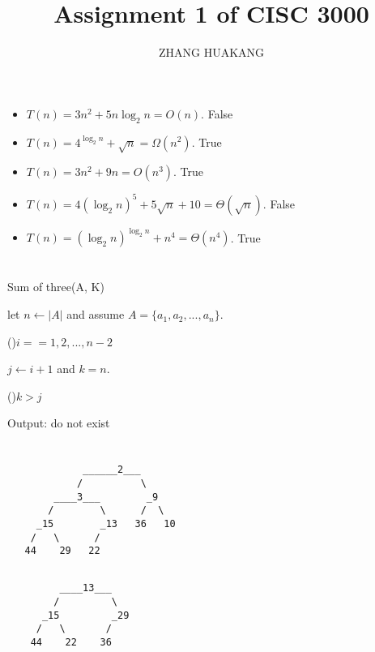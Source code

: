 \documentclass{article}
\title{Assignment 1 of CISC 3000}
\author{ZHANG HUAKANG}
\begin{document}
    \maketitle
    \section{}
    \begin{itemize}
        \item $T(n)=3n^2+5n\log_2n=O(n)$. False
        \item $T(n)=4^{\log_2n}+\sqrt{n}=\Omega(n^2)$. True
        \item $T(n)=3n^2+9n=O(n^3)$. True
        \item $T(n)=4(\log_2n)^5+5\sqrt{n}+10=\Theta(\sqrt{n})$. False
        \item $T(n)=(\log_2n)^{\log_2n}+n^4=\Theta(n^4)$. True
    \end{itemize}
    \section{}
    \begin{algorithm}[H]
        \caption{Sum of three(A, K)}
        let $n \leftarrow |A|$ and assume $A = \{a_1, a_2, . . . , a_n\}$.

        \For(){$i==1,2,...,n-2$}{
            $j\leftarrow i+1$ and $k=n$.

            \While(){$k>j$}{
            }
        }
        Output: do not exist
    \end{algorithm}
    \newpage
    \section{}
    \subsection{}
    \begin{lstlisting}
             ______2___
            /          \
        ____3___        _9
       /        \      /  \
     _15        _13   36   10
    /   \      /
   44    29   22
    \end{lstlisting}
    \subsection{}
    \begin{lstlisting}
         ____13___
        /         \
      _15         _29
     /   \       /
    44    22    36
    \end{lstlisting}
    \newpage
\end{document}
